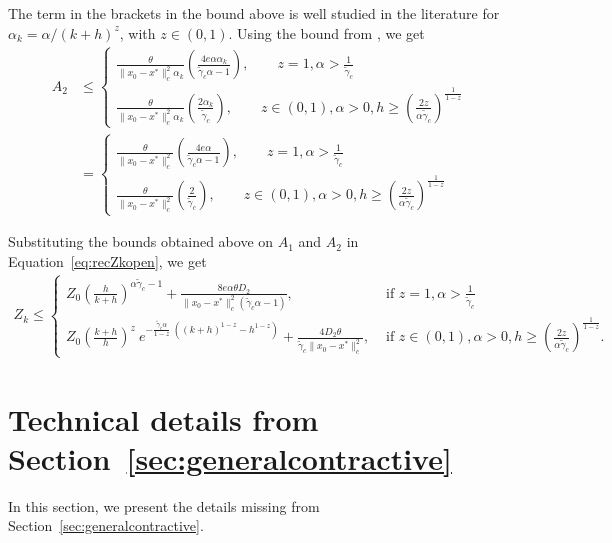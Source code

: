 \documentclass{article}
\newcommand{\lrp}[1]{\left( #1 \right)}
\begin{document}
The term in the brackets in the bound above is well studied in  the literature for $\alpha_k = \alpha/(k+h)^z$, with $z\in(0,1)$. Using the bound from \citet[Appendix A.3.7]{chen2024lyapunov}, we get
\begin{align*}
    A_2 &\le 
    \begin{cases}
            \frac{\theta}{\|x_0-x^*\|^2_c  \alpha_k} \lrp{ \frac{4e\alpha \alpha_k}{\tilde{\gamma}_c\alpha - 1} }, \qquad z = 1, \alpha > \frac{1}{\tilde{\gamma}_c}\\
            \frac{\theta}{\|x_0-x^*\|^2_c  \alpha_k} \lrp{ \frac{2\alpha_k}{\tilde{\gamma}_c} }, \qquad z\in (0,1), \alpha > 0, h \ge \lrp{\frac{2z}{\alpha\tilde{\gamma}_c}}^\frac{1}{1-z}
    \end{cases}\\
    &= \begin{cases}
            \frac{\theta}{\|x_0-x^*\|^2_c } \lrp{ \frac{4e\alpha }{\tilde{\gamma}_c\alpha - 1} }, \qquad z = 1, \alpha > \frac{1}{\tilde{\gamma}_c}\\
            \frac{\theta}{\|x_0-x^*\|^2_c  } \lrp{ \frac{2}{\tilde{\gamma}_c} }, \qquad z\in (0,1), \alpha > 0, h \ge \lrp{\frac{2z}{\alpha\tilde{\gamma}_c}}^\frac{1}{1-z}
    \end{cases}
\end{align*}

Substituting the bounds obtained above on $A_1$ and $A_2$ in Equation~\eqref{eq:recZkopen}, we get
\begin{align*}
    Z_k \le 
    \begin{cases}
        Z_0\lrp{ \frac{h}{k+h} }^{\alpha\tilde{\gamma}_c - 1} + \frac{8 e \alpha\theta D_2 }{\|x_0-x^*\|^2_c \lrp{\tilde{\gamma}_c\alpha - 1} }, & \text{ if } z = 1, \alpha > \frac{1}{\tilde{\gamma}_c}\\
        Z_0\lrp{ \frac{k+h}{h} }^z ~ e^{-\frac{\tilde{\gamma}_c\alpha}{1-z}~\lrp{(k+h)^{1-z} - h^{1-z}} } +  \frac{4 D_2 \theta }{\tilde{\gamma}_c\|x_0-x^*\|^2_c  }, & \text{ if } z\in (0,1), \alpha > 0, h \ge \lrp{\frac{2z}{\alpha\tilde{\gamma}_c}}^\frac{1}{1-z}.
    \end{cases}
\end{align*}

\section{Technical details from Section~\ref{sec:generalcontractive}}\label{app:generalcontractive}
In this section, we present the details missing from Section~\ref{sec:generalcontractive}.
\end{document}
